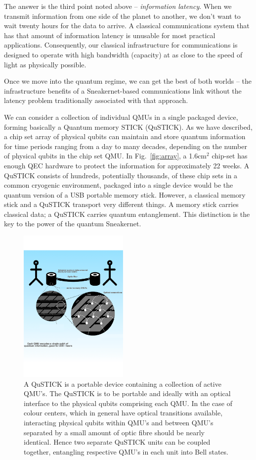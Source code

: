 \documentclass[twocolumn, aps, rmp, amsmath, amssymb, nofootinbib, superscriptaddress, longbibliography, floatfix, table-of-contents, eqsecnum]{revtex4-2}
\begin{document}
The answer is the third point noted above -- \textit{information latency}. When we transmit information from one side of the planet to another, we don't want to wait twenty hours for the data to arrive. A classical communications system that has that amount of information latency is unusable for most practical applications. Consequently, our classical infrastructure for communications is designed to operate with high bandwidth (capacity) at as close to the speed of light as physically possible. 

Once we move into the quantum regime, we can get the best of both worlds -- the infrastructure benefits of a Sneakernet-based communications link without the latency problem traditionally associated with that approach. 

We can consider a collection of individual QMUs in a single packaged device, forming basically a Quantum memory STICK (QuSTICK). As we have described, a chip set array of physical qubits can maintain and store quantum information for time periods ranging from a day to many decades, depending on the number of physical qubits in the chip set QMU. In Fig.~\ref{fig:array}, a 1.6cm$^2$ chip-set has enough QEC hardware to protect the information for approximately 22 weeks. A QuSTICK consists of hundreds, potentially thousands, of these chip sets in a common cryogenic environment, packaged into a single device would be the quantum version of a USB portable memory stick. However, a classical memory stick and a QuSTICK transport very different things. A memory stick carries classical data; a QuSTICK carries quantum entanglement. This distinction is the key to the power of the quantum Sneakernet. 

\begin{figure}[htbp!]
	\includegraphics[clip=true, width=0.475\textwidth]{qustick1}
	\caption{A QuSTICK is a portable device containing a collection of active QMU's.  The QuSTICK is to be portable and ideally with an optical interface to the physical qubits comprising each QMU.  In the case of colour centers, which in general have optical transitions available, interacting physical qubits within QMU's and between QMU's separated by a small amount of optic fibre should be nearly identical.  Hence two separate QuSTICK units can be coupled together, entangling respective QMU's in each unit into Bell states.} \label{fig:qustick1}
\end{figure}
\end{document}
